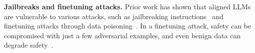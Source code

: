 \textbf{Jailbreaks and finetuning attacks.}
Prior work has shown that aligned LLMs are vulnerable to various attacks, such as jailbreaking instructions~\citep{deng_multilingual_2024, anil_many_2024, greenblatt_alignment_2024} and finetuning attacks through data poisoning~\citep{ qi_fine-tuning_2023, poppi_towards_2024, huang_harmful_2024, bowen_data_2024, pathmanathan_is_2024, jiang_turning_2024}. In a finetuning attack, safety can be compromised with just a few adversarial examples, and even  benign data can degrade safety~\citep{qi_fine-tuning_2023, he_what_2024, davies2025fundamentallimitationsdefendingllm}. 







